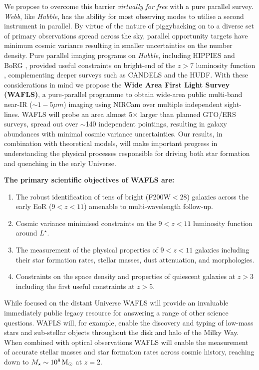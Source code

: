 \documentclass[12pt]{article}
\begin{document}
We propose to overcome this barrier \emph{virtually for free} with a pure parallel survey.
\emph{Webb}, like \emph{Hubble}, has the ability for most observing modes to utilise a second instrument in parallel. By virtue of the nature of piggybacking on to a diverse set of primary observations spread across the sky, parallel opportunity targets have minimum cosmic variance resulting in smaller uncertainties on the number density. Pure parallel imaging programs on \emph{Hubble}, including HIPPIES \citep{2011ApJ...728L..22Y} and BoRG \citep{2011ApJ...727L..39T}, provided useful constraints on bright-end of the $z>7$ luminosity function \citep[e.g][]{2014ApJ...786...57S, 2016ApJ...817..120C, 2016ApJ...827...76B, 2020ApJ...891..146R, 2020arXiv201015637M}, complementing deeper surveys such as CANDELS and the HUDF. With these considerations in mind we propose the \textbf{Wide Area First Light Survey (WAFLS)}, a pure-parallel programme to obtain wide-area public multi-band near-IR ($\sim 1-5\mu m$) imaging using NIRCam over multiple independent sight-lines.  WAFLS will probe an area almost 5$\times$ larger than planned GTO/ERS surveys, spread out over $\sim$140 independent pointings, resulting in galaxy abundances with minimal cosmic variance uncertainties.  Our results, in combination with theoretical models, will make important progress in understanding the physical processes responsible for driving both star formation and quenching in the early Universe. 

\noindent
\textbf{The primary scientific objectives of WAFLS are:}
\vspace{-1mm}
\begin{enumerate}
\item The robust identification of tens of bright (F200W$<28$) galaxies across the early EoR ($9<z<11$) amenable to multi-wavelength follow-up.
\item Cosmic variance minimised constraints on the $9<z<11$ luminosity function around $L^{\star}$.
\item The measurement of the physical properties of $9<z<11$ galaxies including their star formation rates, stellar masses, dust attenuation, and morphologies. 
\item Constraints on the space density and properties of quiescent galaxies at $z>3$ including the first useful constraints at $z>5$.
\end{enumerate}

While focused on the distant Universe WAFLS will provide an invaluable immediately public legacy resource for answering a range of other science questions. WAFLS will, for example, enable the discovery and typing of low-mass stars and sub-stellar objects throughout the disk and halo of the Milky Way. When combined with optical observations WAFLS will enable the measurement of accurate stellar masses and star formation rates across cosmic history, reaching down to $M_{\star}\sim 10^{8}\,{\rm M_{\odot}}$ at $z=2$.
\end{document}
